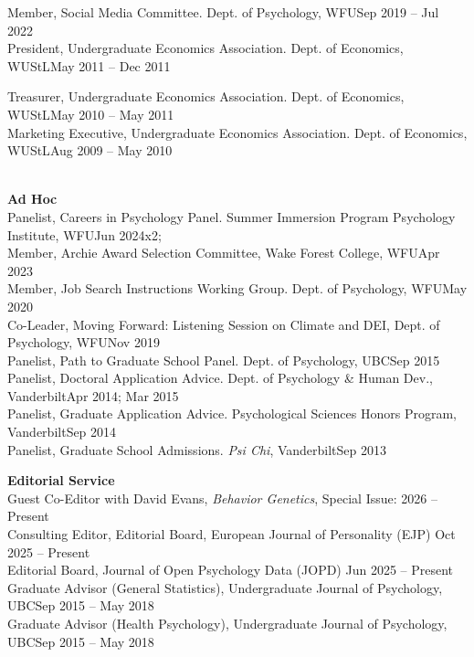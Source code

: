 Member, Social Media Committee. Dept. of Psychology, WFU\hfill {Sep 2019 – Jul 2022}\\
President, Undergraduate Economics Association. Dept. of Economics, WUStL\hfill{May 2011 – Dec 2011}\\
\begin{minipage}{\linewidth}\vspace{1.1mm} Treasurer, Undergraduate Economics Association. Dept. of Economics, WUStL\hfill{May 2010 – May 2011}\\
Marketing Executive, Undergraduate Economics Association. Dept. of Economics, WUStL\hfill {Aug 2009 – May 2010}\end{minipage}\medskip\\
\textrm{\textbf{Ad Hoc}}\\
Panelist, Careers in Psychology Panel. Summer Immersion Program Psychology Institute, WFU\hfill{Jun 2024x2;}\newline
{}\\ %
Member, Archie Award Selection Committee, Wake Forest College, WFU\hfill{Apr 2023}\\
Member, Job Search Instructions Working Group. Dept. of Psychology, WFU\hfill{May 2020}\\
Co-Leader, Moving Forward: Listening Session on Climate and DEI, Dept. of Psychology, WFU\hfill {Nov 2019}\\
Panelist, Path to Graduate School Panel. Dept. of Psychology, UBC\hfill {Sep 2015}\\
Panelist, Doctoral Application Advice. Dept. of Psychology \& Human Dev., Vanderbilt\hfill {Apr 2014; Mar 2015}\\
Panelist, Graduate Application Advice. Psychological Sciences Honors Program, Vanderbilt\hfill {Sep 2014}\\
Panelist, Graduate School Admissions. \textit{Psi Chi}, Vanderbilt\hfill{Sep 2013}\medskip\\
%
%
\begin{minipage}{\linewidth}\vspace{1.1mm} {\large \textbf{Editorial Service}}\\
Guest Co-Editor \small{with David Evans, \textit{Behavior Genetics},} \small{Special Issue: } \hfill{2026 – Present}\\
Consulting Editor, Editorial Board, European Journal of Personality (EJP) \hfill{Oct 2025 – Present}\\
Editorial Board, Journal of Open Psychology Data (JOPD) \hfill{Jun 2025 – Present}\\
Graduate Advisor (General Statistics), Undergraduate Journal of Psychology, UBC\hfill{Sep 2015 – May 2018}\\
Graduate Advisor (Health Psychology), Undergraduate Journal of Psychology, UBC\hfill{Sep 2015 – May 2018}\end{minipage}\medskip\\

